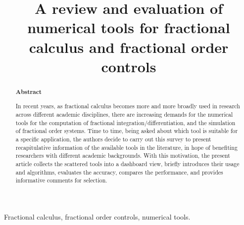\documentclass[11pt]{tCON2e}
\theoremstyle{plain}\newtheorem{theorem}{Theorem}
\theoremstyle{definition}
\theoremstyle{remark}
\begin{document}

\title{\large A review and evaluation of numerical tools for fractional calculus and fractional order controls}

\author{
\large
{}
}



\maketitle


\newpage


\begin{abstract}
\large
\begin{center}
\textbf{Abstract}
\end{center}
In recent years, as fractional calculus becomes more and more broadly used in research across different academic disciplines, there are increasing demands for the numerical tools for the computation of fractional integration/differentiation, and the simulation of fractional order systems. Time to time, being asked about which tool is suitable for a specific application, the authors decide to carry out this survey to present recapitulative information of the available tools in the literature, in hope of benefiting researchers with different academic backgrounds. With this motivation, the present article collects the scattered tools into a dashboard view, briefly introduces their usage and algorithms, evaluates the accuracy, compares the performance, and provides informative comments for selection.
\end{abstract}

\begin{keywords}
\large
Fractional calculus, fractional order controls, numerical tools.
\end{keywords}



\newpage
\end{document}
